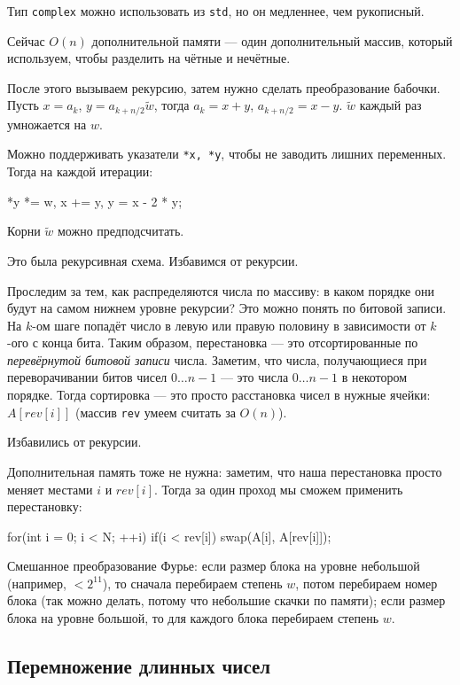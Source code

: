 Тип \texttt{complex} можно использовать из \texttt{std}, но он медленнее, чем рукописный.

Сейчас $O(n)$ дополнительной памяти --- один дополнительный массив, который используем, чтобы разделить на чётные и нечётные.

После этого вызываем рекурсию, затем нужно сделать преобразование бабочки.
Пусть $x=a_k$, $y=a_{k+n/2}\tilde w$, тогда $a_k=x+y$, $a_{k+n/2}=x-y$. $\tilde w$ каждый раз умножается на $w$.

Можно поддерживать указатели \texttt{*x, *y}, чтобы не заводить лишних переменных. Тогда на каждой итерации:
\begin{cppcode}
*y *= w, x += y, y = x - 2 * y;
\end{cppcode}

Корни $\tilde w$ можно предподсчитать.

Это была рекурсивная схема. Избавимся от рекурсии.

Проследим за тем, как распределяются числа по массиву: в каком порядке они будут на самом нижнем уровне рекурсии?
Это можно понять по битовой записи.
На $k$-ом шаге попадёт число в левую или правую половину в зависимости от $k$-ого с конца бита.
Таким образом, перестановка --- это отсортированные по \textit{перевёрнутой битовой записи} числа.
Заметим, что числа, получающиеся при переворачивании битов чисел $0\dots n-1$ --- это числа $0\dots n-1$ в некотором порядке.
Тогда сортировка --- это просто расстановка чисел в нужные ячейки: $A[rev[i]]$ (массив \texttt{rev} умеем считать за $O(n)$).

Избавились от рекурсии.

Дополнительная память тоже не нужна: заметим, что наша перестановка просто меняет местами $i$ и $rev[i]$.
Тогда за один проход мы сможем применить перестановку:
\begin{cppcode}
for(int i = 0; i < N; ++i)
	if(i < rev[i])
		swap(A[i], A[rev[i]]);
\end{cppcode}

Смешанное преобразование Фурье:
если размер блока на уровне небольшой (например, $<2^{11}$), то сначала перебираем степень $w$,
потом перебираем номер блока (так можно делать, потому что небольшие скачки по памяти);
если размер блока на уровне большой,
то для каждого блока перебираем степень $w$.


\subsection{Перемножение длинных чисел}

